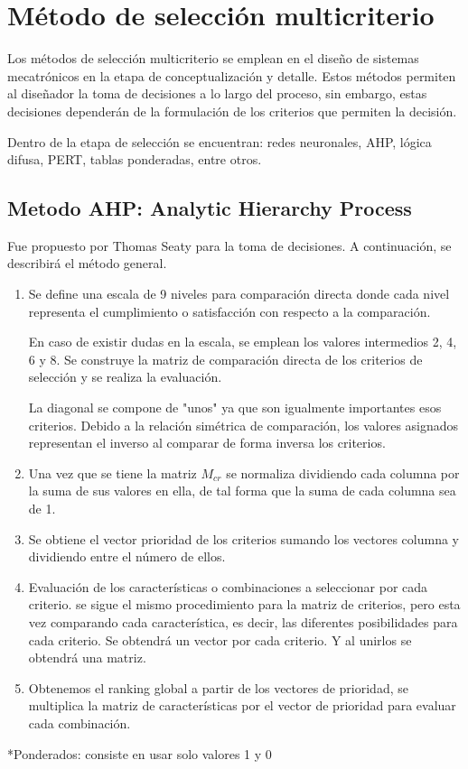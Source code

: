 \section{Método de selección multicriterio}

Los métodos de selección multicriterio se emplean en el diseño de sistemas mecatrónicos en la etapa de conceptualización y detalle. Estos métodos permiten al diseñador la toma de decisiones a lo largo del proceso, sin embargo, estas decisiones dependerán de la formulación de los criterios que permiten la decisión. 

Dentro de la etapa de selección se encuentran: redes neuronales, AHP, lógica difusa, PERT, tablas ponderadas, entre otros. 

\subsection{Metodo AHP: Analytic Hierarchy Process}
Fue propuesto por Thomas Seaty para la toma de decisiones. A continuación, se describirá el método general.

\begin{enumerate}
    \item Se define una escala de 9 niveles para comparación directa donde cada nivel representa el cumplimiento o satisfacción con respecto a la comparación. 
    
    En caso de existir dudas en la escala, se emplean los valores intermedios 2, 4, 6 y 8.
    Se construye la matriz de comparación directa de los criterios de selección y se realiza la evaluación. 
    
    La diagonal se compone de "unos" ya que son igualmente importantes esos criterios. Debido a la relación simétrica de comparación, los valores asignados representan el inverso al comparar de forma inversa los criterios. 
    
    \item Una vez que se tiene la matriz \( M_{cr} \) se normaliza dividiendo cada columna por la suma de sus valores en ella, de tal forma que la suma de cada columna sea de 1. 
    
    \item Se obtiene el vector prioridad de los criterios sumando los vectores columna y dividiendo entre el número de ellos. 
    
    \item Evaluación de los características o combinaciones a seleccionar por cada criterio. se sigue el mismo procedimiento para la matriz de criterios, pero esta vez comparando cada característica, es decir, las diferentes posibilidades para cada criterio. Se obtendrá un vector por cada criterio. Y al unirlos se obtendrá una matriz. 
    
    \item Obtenemos el ranking global a partir de los vectores de prioridad, se multiplica la matriz de características por el vector de prioridad para evaluar cada combinación. 
\end{enumerate}

*Ponderados: consiste en usar solo valores 1 y 0
